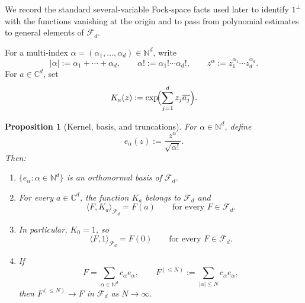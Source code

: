\documentclass[11pt]{amsart}
\newtheorem{proposition}[theorem]{Proposition}
\theoremstyle{remark}
\newcommand{\C}{\mathbb{C}}
\newcommand{\N}{\mathbb{N}}
\newcommand{\abs}[1]{\lvert #1 \rvert}
\newcommand{\Fd}{\mathcal{F}_d}
\begin{document}
We record the standard several-variable Fock-space facts used later to
identify $1^\perp$ with the functions vanishing at the origin and to pass
from polynomial estimates to general elements of $\Fd$.

For a multi-index $\alpha = (\alpha_1,\dots,\alpha_d) \in \N^d$, write
\[
\abs{\alpha} := \alpha_1 + \cdots + \alpha_d,
\qquad
\alpha! := \alpha_1! \cdots \alpha_d!,
\qquad
z^\alpha := z_1^{\alpha_1}\cdots z_d^{\alpha_d}.
\]
For $a \in \C^d$, set
\[
K_a(z) := \exp\!\Bigl(\sum_{j=1}^d z_j \overline{a_j}\Bigr).
\]

\begin{proposition}[Kernel, basis, and truncations]\label{prop:fock-facts}
For $\alpha \in \N^d$, define
\[
e_\alpha(z) := \frac{z^\alpha}{\sqrt{\alpha!}}.
\]
Then:
\begin{enumerate}[(1)]
\item $\{e_\alpha : \alpha \in \N^d\}$ is an orthonormal basis of $\Fd$.
\item For every $a \in \C^d$, the function $K_a$ belongs to $\Fd$ and
\[
\langle F, K_a\rangle_{\Fd} = F(a)
\qquad
\text{for every } F \in \Fd.
\]
\item In particular, $K_0 = 1$, so
\[
\langle F,1\rangle_{\Fd} = F(0)
\qquad
\text{for every } F \in \Fd.
\]
\item If
\[
F = \sum_{\alpha \in \N^d} c_\alpha e_\alpha,
\qquad
F^{(\le N)} := \sum_{\abs{\alpha}\le N} c_\alpha e_\alpha,
\]
then $F^{(\le N)} \to F$ in $\Fd$ as $N \to \infty$.
\end{enumerate}
\end{proposition}
\end{document}
